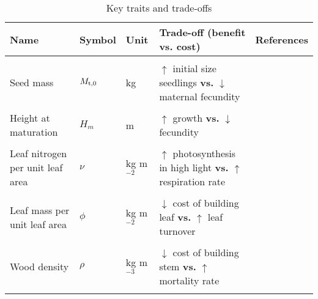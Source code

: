 \documentclass[a4paper,11pt]{article}
\begin{document}
\begin{table}[ht]
 \caption{Key traits and trade-offs}
\centering
{\footnotesize
\raggedright
  \begin{tabular}{p{3cm}p{1cm}p{1.5cm}p{5cm}p{3cm}}
  \\
  \hline
  Name & Symbol & Unit & Trade-off (benefit {\bf vs.} cost) & References \\
  \hline
  \\
  Seed mass & $M_{\rm t, 0}$ & kg & $\uparrow$ initial size seedlings {\bf vs.} $\downarrow$  maternal fecundity & \citet{Moles-2006}\\
  \\
  Height at maturation & $H_m$ & m  & $\uparrow$ growth {\bf vs.} $\downarrow$ fecundity & \citet{Thomas-2011, Wenk-2015}\\
\\
  Leaf nitrogen per unit leaf area & $\nu$ & kg m$^{-2}$ & $\uparrow$ photosynthesis in high light {\bf vs.} $\uparrow$ respiration rate & \citet{Wright-2004}\\
  \\
  Leaf mass per unit leaf area & $\phi$ & kg m$^{-2}$ & $\downarrow$ cost of building leaf {\bf vs.} $\uparrow$ leaf turnover & \citet{Wright-2004}\\
  \\
  Wood density & $\rho$ &  kg m$^{-3}$ & $\downarrow$ cost of building stem {\bf vs.} $\uparrow$ mortality rate & \citet{Chave-2009}\\
  \\
  \hline
  \end{tabular}
}
\label{tab:traits}
\end{table}

\newpage
\end{document}
